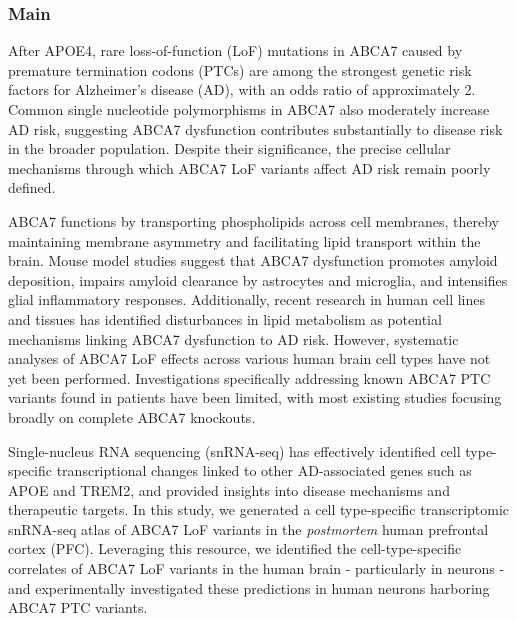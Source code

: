 \subsubsection{Main}

After APOE4, rare loss-of-function (LoF) mutations in ABCA7 caused by premature termination codons (PTCs) are among the strongest genetic risk factors for Alzheimer’s disease (AD), with an odds ratio of approximately 2\supercite{Steinberg2015-mu,Holstege2022-vp}. Common single nucleotide polymorphisms in ABCA7 also moderately increase AD risk\supercite{Holstege2022-vp,Kunkle2019-yo}, suggesting ABCA7 dysfunction contributes substantially to disease risk in the broader population. Despite their significance, the precise cellular mechanisms through which ABCA7 LoF variants affect AD risk remain poorly defined.

ABCA7 functions by transporting phospholipids across cell membranes, thereby maintaining membrane asymmetry and facilitating lipid transport within the brain\supercite{Abe-Dohmae2004-wb,Wang2003-wh,Tomioka2017-nv}. Mouse model studies suggest that ABCA7 dysfunction promotes amyloid deposition, impairs amyloid clearance by astrocytes and microglia, and intensifies glial inflammatory responses\supercite{Satoh2015-yu,Kim2013-sv,Fu2016-qe,Aikawa2019-hv}. Additionally, recent research in human cell lines and tissues has identified disturbances in lipid metabolism as potential mechanisms linking ABCA7 dysfunction to AD risk\supercite{Kawatani2023-vf,Liu2021-zh,Duchateau2024-rf}. However, systematic analyses of ABCA7 LoF effects across various human brain cell types have not yet been performed. Investigations specifically addressing known ABCA7 PTC variants found in patients have been limited, with most existing studies focusing broadly on complete ABCA7 knockouts\supercite{Kawatani2023-vf,Tayran2024-qw,Kim2013-sv}.

Single-nucleus RNA sequencing (snRNA-seq) has effectively identified cell type-specific transcriptional changes linked to other AD-associated genes such as APOE and TREM2\supercite{Brase2023-xk,Blanchard2022-cf,Sayed2021-qn}, and provided insights into disease mechanisms and therapeutic targets. In this study, we generated a cell type-specific transcriptomic snRNA-seq atlas of ABCA7 LoF variants in the \textit{postmortem} human prefrontal cortex (PFC). Leveraging this resource, we identified the cell-type-specific correlates of ABCA7 LoF variants in the human brain - particularly in neurons - and experimentally investigated these predictions in human neurons harboring ABCA7 PTC variants.

